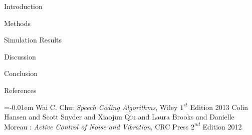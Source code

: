 \documentclass[a0paper,landscape]{baposter}
\begin{document}
\begin{poster}

\begin{posterbox}[name=intro,column=0,span=1,row=0,height=0.38]{Introduction}

\end{posterbox}

\begin{posterbox}[name=Materials,column=0,below=intro, above=bottom]{Methods}

\end{posterbox}

\begin{posterbox}[name=Results,column=1,row=0,height=0.88,span=2]{Simulation Results}

\end{posterbox}

\begin{posterbox}[name=discussion,column=3,row=0]{Discussion}
	
\end{posterbox}

\begin{posterbox}[name=conclusion,column=3, below=discussion, above=bottom]{Conclusion}
	
\end{posterbox}

%	


\begin{posterbox}[name=refs,column=1,span=2,above=bottom]{References}
\small

\begin{thebibliography}{1}%
\itemsep=-0.01em%
\setlength{\baselineskip}{0.4em}%
 Wai C. Chu: \emph{Speech Coding Algorithms}, Wiley $1^{st}$ Edition 2013
 Colin Hansen and Scott Snyder and Xiaojun Qiu and Laura Brooks and Danielle Moreau  : \emph{Active Control of Noise and Vibration}, CRC Press $2^{nd}$ Edition 2012
\end{thebibliography}
\end{posterbox}



\end{poster}
\end{document}
